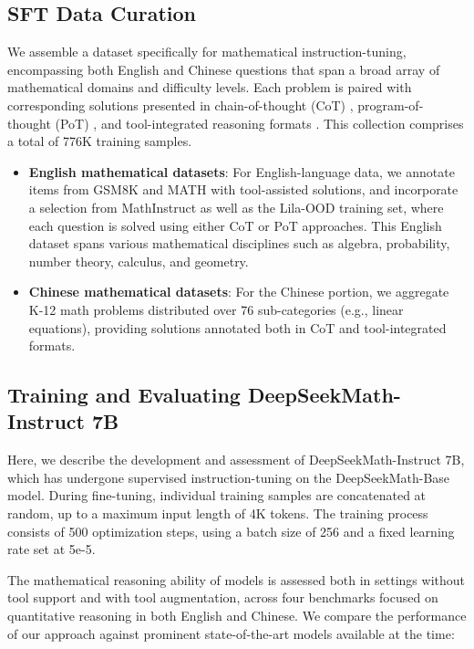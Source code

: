 \subsection{SFT Data Curation}

We assemble a dataset specifically for mathematical instruction-tuning, encompassing both English and Chinese questions that span a broad array of mathematical domains and difficulty levels. Each problem is paired with corresponding solutions presented in chain-of-thought (CoT) \citep{cot}, program-of-thought (PoT) \citep{pot,pal}, and tool-integrated reasoning formats \citep{tora}. This collection comprises a total of 776K training samples.

\begin{itemize}[topsep=0pt]
    \item \textbf{English mathematical datasets}: For English-language data, we annotate items from GSM8K and MATH with tool-assisted solutions, and incorporate a selection from MathInstruct \citep{MathInstruct} as well as the Lila-OOD \citep{lila} training set, where each question is solved using either CoT or PoT approaches. This English dataset spans various mathematical disciplines such as algebra, probability, number theory, calculus, and geometry.
    \item \textbf{Chinese mathematical datasets}: For the Chinese portion, we aggregate K-12 math problems distributed over 76 sub-categories (e.g., linear equations), providing solutions annotated both in CoT and tool-integrated formats.
\end{itemize}

\subsection{Training and Evaluating DeepSeekMath-Instruct 7B}

Here, we describe the development and assessment of DeepSeekMath-Instruct 7B, which has undergone supervised instruction-tuning on the DeepSeekMath-Base model. During fine-tuning, individual training samples are concatenated at random, up to a maximum input length of 4K tokens. The training process consists of 500 optimization steps, using a batch size of 256 and a fixed learning rate set at 5e-5.

The mathematical reasoning ability of models is assessed both in settings without tool support and with tool augmentation, across four benchmarks focused on quantitative reasoning in both English and Chinese. We compare the performance of our approach against prominent state-of-the-art models available at the time:


